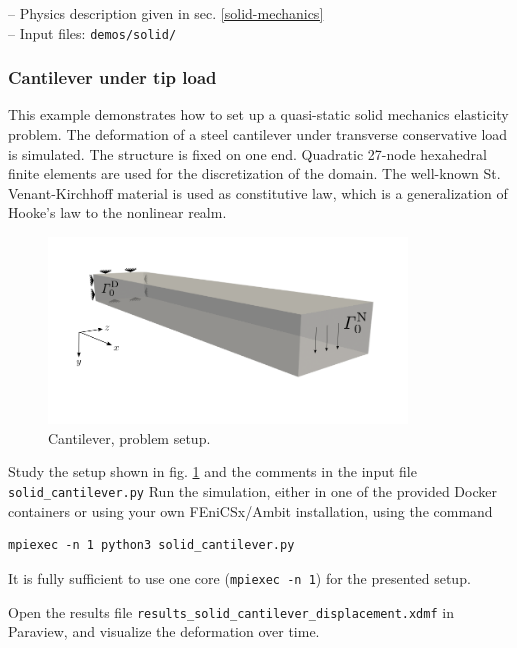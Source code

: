 \documentclass[a4paper,12pt]{report}
\begin{document}
-- Physics description given in sec. \ref{solid-mechanics}\\

-- Input files: \verb"demos/solid/"

\subsubsection*{Cantilever under tip load}

This example demonstrates how to set up a quasi-static solid mechanics elasticity problem. The deformation of a steel cantilever under transverse conservative load is simulated. The structure is fixed on one end. Quadratic 27-node hexahedral finite elements are used for the discretization of the domain. The well-known St. Venant-Kirchhoff material is used as constitutive law, which is a generalization of Hooke's law to the nonlinear realm.\\

\begin{figure}
\centering
\includegraphics[width=0.85\textwidth]{fig/cantilever_setup.png}
\caption{Cantilever, problem setup.}
\label{fig:cantilever_setup}
\end{figure}

Study the setup shown in fig. \ref{fig:cantilever_setup} and the comments in the input file \verb"solid_cantilever.py" Run the simulation, either in one of the provided Docker containers or using your own FEniCSx/Ambit installation, using the command

\begin{verbatim}
mpiexec -n 1 python3 solid_cantilever.py
\end{verbatim}

It is fully sufficient to use one core (\verb"mpiexec -n 1") for the presented setup.

Open the results file \verb"results_solid_cantilever_displacement.xdmf" in Paraview, and visualize the deformation over time.
\end{document}
